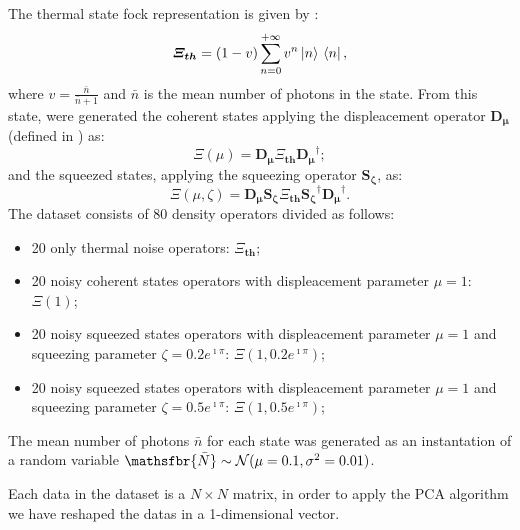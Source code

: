 \documentclass[%
    twoside, 
    a4paper
    ]{article}
\DeclareRobustCommand{\msf}[1]{%
  \ifcat\noexpand#1\relax\msfgreek{#1}\else\mathsfbr{#1}\fi%
}
\begin{document}
        The thermal state fock representation is given by \cite{tesiGuerrini}:
        \begin{equation}
            \label{eq:thermalState}
            \bm{\varXi_{th}} = (1-v) \sum_{n=0}^{+\infty}v^n \ket*{n} \bra*{n},
        \end{equation}
        where $v = \frac{\bar{n}}{\bar{n}+1}$ and $\bar{n}$ is the mean number of photons
        in the state.
        From this state, were generated the coherent states applying the displeacement operator
        $\bm{D_{\mu}}$ (defined in \cite{tesiGuerrini}) as:
        \begin{equation}
            \label{eq:coherentState}
            \bm{\varXi}(\mu) = \bm{D_{\mu}} \bm{\varXi_{th}} \bm{D_{\mu}}^{\dagger};
        \end{equation}
        and the squeezed states, applying the squeezing operator $\bm{S_\zeta}$, as:
        \begin{equation}
            \label{eq:squeezedState}
            \bm{\varXi}(\mu, \zeta) = \bm{D_{\mu}} \bm{S_{\zeta}} \bm{\varXi_{th}} \bm{S_{\zeta}}^{\dagger} 
            \bm{D_{\mu}}^{\dagger}.
        \end{equation}
        The dataset consists of 80 density operators divided as follows:
        \begin{itemize}
            \item 20 only thermal noise operators: $\bm{\varXi_{th}}$;
            \item 20 noisy coherent states operators with displeacement parameter
            $\mu = 1$: $\bm{\varXi}(1)$;
            \item 20 noisy squeezed states operators with displeacement parameter
            $\mu = 1$ and squeezing parameter $\zeta = 0.2 e^{\imath \pi}$: 
            $\bm{\varXi}(1, 0.2 e^{\imath \pi})$;
            \item 20 noisy squeezed states operators with displeacement parameter
            $\mu = 1$ and squeezing parameter $\zeta = 0.5 e^{\imath \pi}$: 
            $\bm{\varXi}(1, 0.5 e^{\imath \pi})$;
        \end{itemize}
        The mean number of photons $\bar{n}$ for each state was generated as an 
        instantation of a random variable 
        $\msf{\bar{N}} \sim \mathcal{N}(\mu = 0.1, \sigma^2 = 0.01)$.

        Each data in the dataset is a $N \times N$ matrix, in order to apply the PCA
        algorithm we have reshaped the datas in a 1-dimensional vector. 
\end{document}
